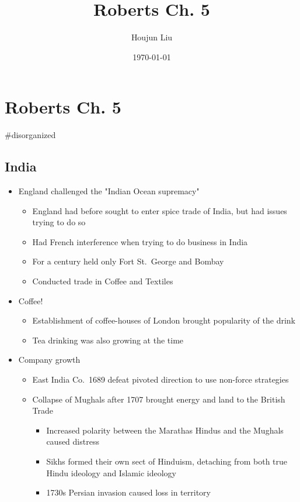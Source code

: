 \documentclass[letterpaper]{article}
\author{Houjun Liu}
\date{\today}
\title{Roberts Ch. 5}
\renewcommand\maketitle{}
\begin{document}
\maketitle


\section{Roberts Ch. 5}
\label{sec:orgb1541de}
\#disorganized

\subsection{India}
\label{sec:org494c70d}
\begin{itemize}
\item England challenged the "Indian Ocean supremacy"

\begin{itemize}
\item England had before sought to enter spice trade of India, but had
issues trying to do so
\item Had French interference when trying to do business in India
\item For a century held only Fort St. George and Bombay
\item Conducted trade in Coffee and Textiles
\end{itemize}

\item Coffee!

\begin{itemize}
\item Establishment of coffee-houses of London brought popularity of the
drink
\item Tea drinking was also growing at the time
\end{itemize}

\item Company growth

\begin{itemize}
\item East India Co. 1689 defeat pivoted direction to use non-force
strategies
\item Collapse of Mughals after 1707 brought energy and land to the
British Trade

\begin{itemize}
\item Increased polarity between the Marathas Hindus and the Mughals
caused distress
\item Sikhs formed their own sect of Hinduism, detaching from both true
Hindu ideology and Islamic ideology
\item 1730s Persian invasion caused loss in territory
\end{itemize}


\end{itemize}
\end{itemize}
\end{document}
